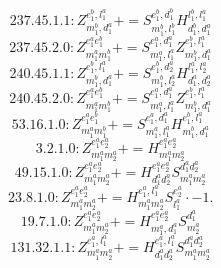 \documentclass[letterpaper,10pt,fleqn,leqno,onecolumn]{article}
\begin{document}
\begin{equation} \;\;\;\;\;\;  237.45.1.1: Z^{e_{1}^{b},l_{1}^{a}}_{m_{1}^{b},d_{1}^{a}}+=S^{e_{1}^{b},d_{1}^{b}}_{m_{1}^{b},l_{1}^{b}}H^{l_{1}^{b},l_{1}^{a}}_{d_{1}^{b},d_{1}^{a}} \end{equation}
\begin{equation} \;\;\;\;\;\;  237.45.2.0: Z^{e_{1}^{a}e_{1}^{b}}_{m_{1}^{a}m_{1}^{b}}+=S^{e_{1}^{a},d_{1}^{a}}_{m_{1}^{a},l_{1}^{a}}Z^{e_{1}^{b},l_{1}^{a}}_{m_{1}^{b},d_{1}^{a}} \end{equation}
\begin{equation} \;\;\;\;\;\;  240.45.1.1: Z^{e_{1}^{b},l_{1}^{a}}_{m_{1}^{b},d_{1}^{a}}+=S^{e_{1}^{b},d_{2}^{a}}_{m_{1}^{b},l_{2}^{a}}H^{l_{1}^{a},l_{2}^{a}}_{d_{1}^{a},d_{2}^{a}} \end{equation}
\begin{equation} \;\;\;\;\;\;  240.45.2.0: Z^{e_{1}^{a}e_{1}^{b}}_{m_{1}^{a}m_{1}^{b}}+=S^{e_{1}^{a},d_{1}^{a}}_{m_{1}^{a},l_{1}^{a}}Z^{e_{1}^{b},l_{1}^{a}}_{m_{1}^{b},d_{1}^{a}} \end{equation}
\begin{equation} \;\;\;\;\;\;  53.16.1.0: Z^{e_{1}^{a}e_{1}^{b}}_{m_{1}^{a}m_{1}^{b}}+=S^{e_{1}^{a},d_{1}^{a}}_{m_{1}^{a},l_{1}^{a}}H^{e_{1}^{b},l_{1}^{a}}_{m_{1}^{b},d_{1}^{a}} \end{equation}
\begin{equation} \;\;\;\;\;\;  3.2.1.0: Z^{e_{1}^{a}e_{2}^{a}}_{m_{1}^{a}m_{2}^{a}}+=H^{e_{1}^{a}e_{2}^{a}}_{m_{1}^{a}m_{2}^{a}} \end{equation}
\begin{equation} \;\;\;\;\;\;  49.15.1.0: Z^{e_{1}^{a}e_{2}^{a}}_{m_{1}^{a}m_{2}^{a}}+=H^{e_{1}^{a}e_{2}^{a}}_{d_{1}^{a}d_{2}^{a}}S^{d_{1}^{a}d_{2}^{a}}_{m_{1}^{a}m_{2}^{a}} \end{equation}
\begin{equation} \;\;\;\;\;\;  23.8.1.0: Z^{e_{1}^{a}e_{2}^{a}}_{m_{1}^{a}m_{2}^{a}}+=H^{e_{1}^{a},l_{1}^{a}}_{m_{1}^{a}m_{2}^{a}}S^{e_{2}^{a}}_{l_{1}^{a}}\cdot -1. \end{equation}
\begin{equation} \;\;\;\;\;\;  19.7.1.0: Z^{e_{1}^{a}e_{2}^{a}}_{m_{1}^{a}m_{2}^{a}}+=H^{e_{1}^{a}e_{2}^{a}}_{m_{1}^{a},d_{1}^{a}}S^{d_{1}^{a}}_{m_{2}^{a}} \end{equation}
\begin{equation} \;\;\;\;\;\;  131.32.1.1: Z^{e_{1}^{a},l_{1}^{a}}_{m_{1}^{a}m_{2}^{a}}+=H^{e_{1}^{a},l_{1}^{a}}_{d_{1}^{a}d_{2}^{a}}S^{d_{1}^{a}d_{2}^{a}}_{m_{1}^{a}m_{2}^{a}} \end{equation}
\end{document}
